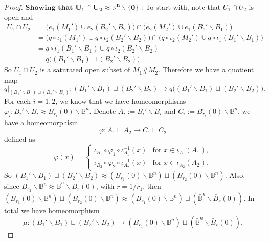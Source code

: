 \documentclass[a4paper]{article}
\theoremstyle{remark}
\newcommand{\rn}{\mathbb{R}^n} %
\newcommand{\openball}{\mathbb{B}} %
\newcommand{\closedball}{\bar{\mathbb{B}}} %
\begin{document}
\begin{proof}
    $\textbf{Showing that }\mathbf{U_1 \cap U_2 \approx \rn \smallsetminus \{0\}}$ : To start with, note that $U_1 \cap U_2$ is open and 
    \begin{align*}
     U_1 \cap U_2 &= \big( e_1(M_1') \cup e_2(B_2'\smallsetminus B_2) \big)\cap \big( e_2(M_2') \cup e_1(B_1' \smallsetminus B_1) \big) \\
     &=  \big(q \circ \iota_1(M_1') \cup q\circ \iota_2(B_2'\smallsetminus B_2) \big) \cap \big( q\circ \iota_2(M_2') \cup q\circ \iota_1(B_1'\smallsetminus B_1) \big)  \\
     &= q\circ \iota_1(B_1' \smallsetminus B_1) \cup q\circ \iota_2(B_2' \smallsetminus B_2) \\
     &= q\big((B_1'\smallsetminus B_1) \sqcup (B_2'\smallsetminus B_2) \big).
    \end{align*}
    So $U_1 \cap U_2$ is a saturated open subset of $M_1 \# M_2$. Therefore we have a quotient map
    $$
    q|_{(B_1'\smallsetminus B_1) \sqcup (B_2'\smallsetminus B_2)} : (B_1'\smallsetminus B_1) \sqcup (B_2'\smallsetminus B_2) \to  q\big((B_1'\smallsetminus B_1) \sqcup (B_2'\smallsetminus B_2) \big).
    $$
    For each $i=1,2$, we know that we have homeomorphisms $\varphi_i : B_i' \smallsetminus B_i \approx B_{r_i}(0) \smallsetminus \openball^n$. Denote $A_i:=B_i'\smallsetminus B_i$ and $C_i:= B_{r_i}(0) \smallsetminus \openball^n$,  we have a homeomorphism
    $$
    \varphi : A_1 \sqcup A_2 \to C_1 \sqcup C_2
    $$ 
    defined as
    \begin{equation*}
    \varphi(x) =  \left\{
    \begin{array}{rl}
    \iota_{B_1} \circ \varphi_1 \circ \iota_{A_1}^{-1} (x) & \text{for } x \in \iota_{A_1}(A_1),\\
    \iota_{B_2} \circ \varphi_2 \circ \iota_{A_2}^{-1} (x) & \text{for } x \in \iota_{A_2}(A_2).
    \end{array} \right.
    \end{equation*}
    So $(B_1'\smallsetminus B_1) \sqcup (B_2'\smallsetminus B_2) \approx (B_{r_1}(0) \smallsetminus \openball^n) \sqcup (B_{r_2}(0) \smallsetminus \openball^n)$. Also, since $B_{r_2} \smallsetminus \openball^n \approx \closedball^n \smallsetminus \bar{B}_{r}(0) $, with $r = 1/r_1$, then $(B_{r_1}(0) \smallsetminus \openball^n) \sqcup (B_{r_2}(0) \smallsetminus \openball^n) \approx (B_{r_1}(0) \smallsetminus \openball^n) \sqcup (\closedball^n \smallsetminus \bar{B}_{r}(0))$. In total we have homeomorphism 
    $$
    \mu : (B_1'\smallsetminus B_1) \sqcup (B_2'\smallsetminus B_2) \to (B_{r_1}(0) \smallsetminus \openball^n) \sqcup (\closedball^n \smallsetminus \bar{B}_{r}(0)).
$$
\end{proof}
\end{document}

